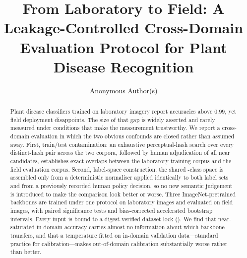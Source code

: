 \documentclass[runningheads]{llncs}
\begin{document}
\title{From Laboratory to Field: A Leakage-Controlled Cross-Domain
Evaluation Protocol for Plant Disease Recognition}

\author{Anonymous Author(s)}

\maketitle

\begin{abstract}
Plant disease classifiers trained on laboratory imagery report accuracies above
$0.99$, yet field deployment disappoints. The size of that gap is widely
asserted and rarely measured under conditions that make the measurement
trustworthy. We report a cross-domain evaluation in which the two obvious
confounds are closed rather than assumed away. First, train/test contamination:
an exhaustive perceptual-hash search over every distinct-hash pair across the
two corpora, followed by human adjudication of all \NLeakNearCore{} near
candidates, establishes \NLeakExactCore{} exact overlaps between the
laboratory training corpus and the field evaluation corpus. Second, label-space
construction: the shared \NSharedClasses{}-class space is assembled only from a
deterministic normaliser applied identically to both label sets and from a
previously recorded human policy decision, so no new semantic judgement is
introduced to make the comparison look better or worse. Three ImageNet-pretrained
backbones are trained under one protocol on \NPv{} laboratory images and
evaluated on \NXdImages{} field images, with paired significance tests and
bias-corrected accelerated bootstrap intervals. Every input is bound to a
digest-verified dataset lock (\LockDigest{}). We find that near-saturated
in-domain accuracy carries almost no information about which backbone transfers,
and that a temperature fitted on in-domain validation data---standard practice
for calibration---makes out-of-domain calibration substantially worse rather
than better.

\end{abstract}
\end{document}
